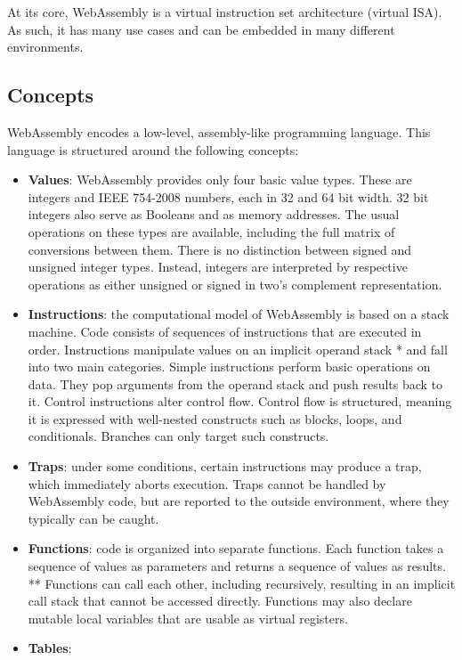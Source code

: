 At its core, WebAssembly is a virtual instruction set architecture (virtual ISA). As such, it has many use cases and can be embedded in many different environments.

\subsection{Concepts} \cite{wasm1}

WebAssembly encodes a low-level, assembly-like programming language. 
This language is structured around the following concepts:

\begin{itemize} 
  \item \textbf{Values}:
  WebAssembly provides only four basic value types. These are integers and IEEE 754-2008 numbers, each in 32 and 64 bit width. 32 bit integers also serve as Booleans and as memory addresses. The usual operations on these types are available, including the full matrix of conversions between them. There is no distinction between signed and unsigned integer types. Instead, integers are interpreted by respective operations as either unsigned or signed in two’s complement representation.
  \item \textbf{Instructions}:
  the computational model of WebAssembly is based on a stack machine. Code consists of sequences of instructions that are executed in order. Instructions manipulate values on an implicit operand stack * and fall into two main categories. Simple instructions perform basic operations on data. They pop arguments from the operand stack and push results back to it. Control instructions alter control flow. Control flow is structured, meaning it is expressed with well-nested constructs such as blocks, loops, and conditionals. Branches can only target such constructs.
  \item \textbf{Traps}:
  under some conditions, certain instructions may produce a trap, which immediately aborts execution. Traps cannot be handled by WebAssembly code, but are reported to the outside environment, where they typically can be caught.
  \item \textbf{Functions}:
  code is organized into separate functions. Each function takes a sequence of values as parameters and returns a sequence of values as results. ** Functions can call each other, including recursively, resulting in an implicit call stack that cannot be accessed directly. Functions may also declare mutable local variables that are usable as virtual registers.
  \item \textbf{Tables}:

\end{itemize}
